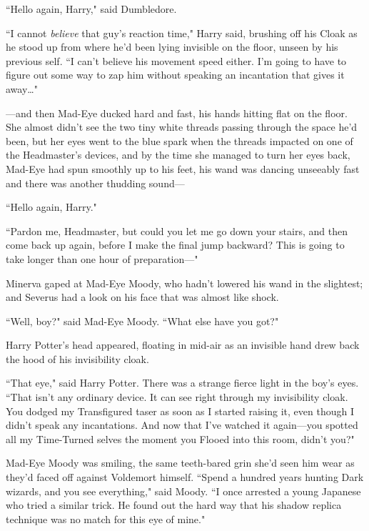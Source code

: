 \later

``Hello again, Harry," said Dumbledore.

``I cannot \emph{believe} that guy's reaction time," Harry said, brushing off his Cloak as he stood up from where he'd been lying invisible on the floor, unseen by his previous self. ``I can't believe his movement speed either. I'm going to have to figure out some way to zap him without speaking an incantation that gives it away{\ldots}"

\later

—and then Mad-Eye ducked hard and fast, his hands hitting flat on the floor. She almost didn't see the two tiny white threads passing through the space he'd been, but her eyes went to the blue spark when the threads impacted on one of the Headmaster's devices, and by the time she managed to turn her eyes back, Mad-Eye had spun smoothly up to his feet, his wand was dancing unseeably fast and there was another thudding sound—

\later

``Hello again, Harry."

``Pardon me, Headmaster, but could you let me go down your stairs, and then come back up again, before I make the final jump backward? This is going to take longer than one hour of preparation—"

\later

Minerva gaped at Mad-Eye Moody, who hadn't lowered his wand in the slightest; and Severus had a look on his face that was almost like shock.

``Well, boy?" said Mad-Eye Moody. ``What else have you got?"

Harry Potter's head appeared, floating in mid-air as an invisible hand drew back the hood of his invisibility cloak.

``That eye," said Harry Potter. There was a strange fierce light in the boy's eyes. ``That isn't any ordinary device. It can see right through my invisibility cloak. You dodged my Transfigured taser as soon as I started raising it, even though I didn't speak any incantations. And now that I've watched it again—you spotted all my Time-Turned selves the moment you Flooed into this room, didn't you?"

Mad-Eye Moody was smiling, the same teeth-bared grin she'd seen him wear as they'd faced off against Voldemort himself. ``Spend a hundred years hunting Dark wizards, and you see everything," said Moody. ``I once arrested a young Japanese who tried a similar trick. He found out the hard way that his shadow replica technique was no match for this eye of mine."


